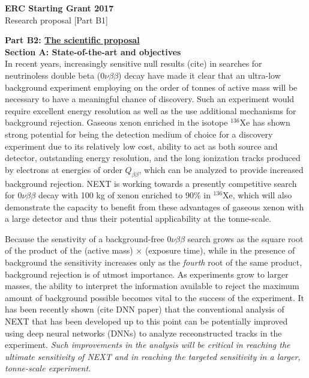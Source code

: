 \documentclass[11pt,a4paper]{article}
\begin{document}
\newpage
{}
\begin{center}
	\large
	\textbf{ERC Starting Grant 2017}\\
	Research proposal [Part B1]\\[2.0\baselineskip]
\end{center}

\noindent\textbf{Part B2: \underline{The scientific proposal}}\\

{\noindent\textbf{Section A: State-of-the-art and objectives}}\\
In recent years, increasingly sensitive null results (cite) in searches for neutrinoless double beta ($0\nu\beta\beta$) decay have made it clear that an ultra-low background experiment 
employing on the order of tonnes of active mass will be necessary to have a meaningful chance of discovery.  Such an experiment would require excellent energy resolution as well as the use
additional mechanisms for background rejection.  Gaseous xenon enriched in the isotope $^{136}$Xe has shown strong potential for being the 
detection medium of choice for a discovery experiment due to its relatively low cost, ability to act as both source and detector, outstanding energy resolution, and the long ionization 
tracks produced by electrons at energies of order $Q_{\beta\beta}$, which can be analyzed to provide increased background rejection.  NEXT is working towards a presently competitive search 
for $0\nu\beta\beta$ decay with 100 kg of xenon enriched to 90\% in $^{136}$Xe, which will also demonstrate the capacity to benefit from these advantages of gaseous xenon with a 
large detector and thus their potential applicability at the tonne-scale.

Because the senstivity of a background-free $0\nu\beta\beta$ search grows as the square root of the product of the (active mass) $\times$ (exposure time), while in the presence of background the sensitivity increases only as the \emph{fourth} root of the same product, background rejection is of utmost importance. As experiments grow to larger masses, the ability to interpret the information available to reject the maximum amount of background possible becomes vital to the success of the experiment.  It has been recently shown (cite DNN paper) that the conventional analysis of NEXT that has been developed up to this point can be potentially improved using deep neural networks (DNNs) to analyze receonstructed tracks in the experiment. \emph{Such improvements in the analysis will be critical in reaching the ultimate sensitivity of NEXT and in reaching the targeted sensitivity in a larger, tonne-scale experiment.}\\
\end{document}

